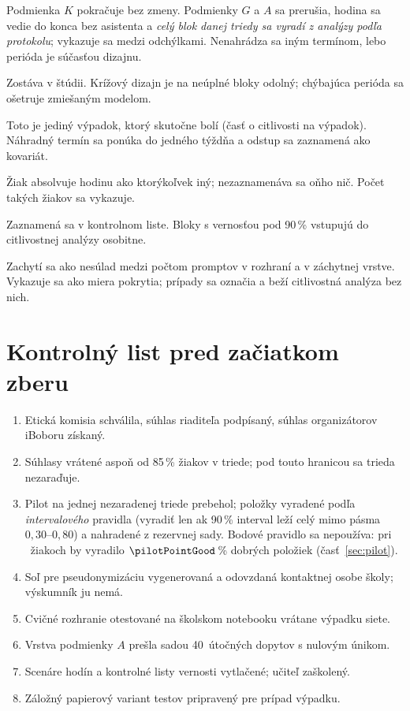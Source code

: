 \begin{description}[leftmargin=0.6cm, nosep]
    \item[\textbf{Vypadne internet.}] Podmienka $K$ pokračuje bez zmeny. Podmienky $G$ a $A$ sa prerušia, hodina sa vedie do konca bez asistenta a \emph{celý blok danej triedy sa vyradí z analýzy podľa protokolu}; vykazuje sa medzi odchýlkami. Nenahrádza sa iným termínom, lebo perióda je súčasťou dizajnu.
    \item[\textbf{Žiak chýba na jednej perióde.}] Zostáva v štúdii. Krížový dizajn je na neúplné bloky odolný; chýbajúca perióda sa ošetruje zmiešaným modelom.
    \item[\textbf{Žiak chýba na T4.}] Toto je jediný výpadok, ktorý skutočne bolí (časť o citlivosti na výpadok). Náhradný termín sa ponúka do jedného týždňa a odstup sa zaznamená ako kovariát.
    \item[\textbf{Chýba súhlas.}] Žiak absolvuje hodinu ako ktorýkoľvek iný; nezaznamenáva sa oňho nič. Počet takých žiakov sa vykazuje.
    \item[\textbf{Učiteľ sa odchýli od scenára.}] Zaznamená sa v kontrolnom liste. Bloky s vernosťou pod 90\,\% vstupujú do citlivostnej analýzy osobitne.
    \item[\textbf{Žiak použije vlastný telefón.}] Zachytí sa ako nesúlad medzi počtom promptov v rozhraní a v záchytnej vrstve. Vykazuje sa ako miera pokrytia; prípady sa označia a beží citlivostná analýza bez nich.
\end{description}

\section{Kontrolný list pred začiatkom zberu}

\begin{enumerate}[nosep]
    \item Etická komisia schválila, súhlas riaditeľa podpísaný, súhlas organizátorov iBoboru získaný.
    \item Súhlasy vrátené aspoň od 85\,\% žiakov v triede; pod touto hranicou sa trieda nezaraďuje.
    \item Pilot na jednej nezaradenej triede prebehol; položky vyradené podľa \emph{intervalového} pravidla (vyradiť len ak 90\,\% interval leží celý mimo pásma $0{,}30$--$0{,}80$) a nahradené z rezervnej sady. Bodové pravidlo sa nepoužíva: pri \pilotN{}~žiakoch by vyradilo $\pilotPointGood$\,\% dobrých položiek (časť~\ref{sec:pilot}).
    \item Soľ pre pseudonymizáciu vygenerovaná a odovzdaná kontaktnej osobe školy; výskumník ju nemá.
    \item Cvičné rozhranie otestované na školskom notebooku vrátane výpadku siete.
    \item Vrstva podmienky $A$ prešla sadou 40~útočných dopytov s nulovým únikom.
    \item Scenáre hodín a kontrolné listy vernosti vytlačené; učiteľ zaškolený.
    \item Záložný papierový variant testov pripravený pre prípad výpadku.
\end{enumerate}
